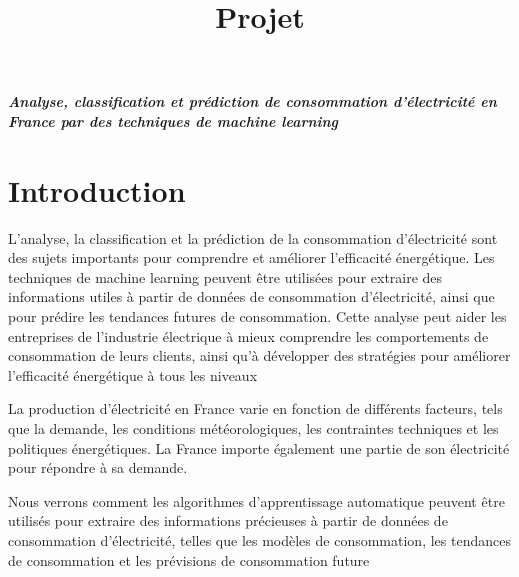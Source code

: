 \documentclass[11pt]{article}
\title{Projet}
\begin{document}
    
    \maketitle
    
    

    
    \textbf{\emph{Analyse, classification et prédiction de consommation
d'électricité en France par des techniques de machine learning}}

    \hypertarget{introduction}{%
\section{Introduction}\label{introduction}}

L'analyse, la classification et la prédiction de la consommation
d'électricité sont des sujets importants pour comprendre et améliorer
l'efficacité énergétique. Les techniques de machine learning peuvent
être utilisées pour extraire des informations utiles à partir de données
de consommation d'électricité, ainsi que pour prédire les tendances
futures de consommation. Cette analyse peut aider les entreprises de
l'industrie électrique à mieux comprendre les comportements de
consommation de leurs clients, ainsi qu'à développer des stratégies pour
améliorer l'efficacité énergétique à tous les niveaux

    La production d'électricité en France varie en fonction de différents
facteurs, tels que la demande, les conditions météorologiques, les
contraintes techniques et les politiques énergétiques. La France importe
également une partie de son électricité pour répondre à sa demande.

    Nous verrons comment les algorithmes d'apprentissage automatique peuvent
être utilisés pour extraire des informations précieuses à partir de
données de consommation d'électricité, telles que les modèles de
consommation, les tendances de consommation et les prévisions de
consommation future
\end{document}
